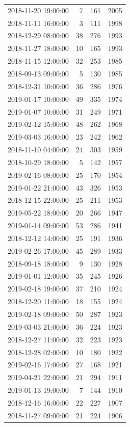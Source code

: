 \begin{tabular}{lrrr}
2018-11-20 19:00:00 & 7 & 161 & 2005 \\
2018-11-11 16:00:00 & 3 & 111 & 1998 \\
2018-12-29 08:00:00 & 38 & 276 & 1993 \\
2018-11-27 18:00:00 & 10 & 165 & 1993 \\
2018-11-15 12:00:00 & 32 & 253 & 1985 \\
2018-09-13 09:00:00 & 5 & 130 & 1985 \\
2018-12-31 10:00:00 & 36 & 286 & 1976 \\
2019-01-17 10:00:00 & 49 & 335 & 1974 \\
2019-01-07 10:00:00 & 31 & 249 & 1971 \\
2019-02-12 15:00:00 & 48 & 262 & 1968 \\
2019-03-03 16:00:00 & 23 & 242 & 1962 \\
2018-11-10 04:00:00 & 24 & 303 & 1959 \\
2018-10-29 18:00:00 & 5 & 142 & 1957 \\
2019-02-16 08:00:00 & 25 & 170 & 1954 \\
2019-01-22 21:00:00 & 43 & 326 & 1953 \\
2018-12-15 22:00:00 & 25 & 211 & 1953 \\
2019-05-22 18:00:00 & 20 & 266 & 1947 \\
2019-01-14 09:00:00 & 53 & 286 & 1941 \\
2018-12-12 14:00:00 & 25 & 191 & 1936 \\
2019-02-26 17:00:00 & 45 & 289 & 1933 \\
2018-09-18 18:00:00 & 9 & 130 & 1928 \\
2019-01-01 12:00:00 & 35 & 245 & 1926 \\
2019-02-18 19:00:00 & 37 & 210 & 1924 \\
2018-12-20 11:00:00 & 18 & 155 & 1924 \\
2019-02-18 09:00:00 & 50 & 287 & 1923 \\
2019-03-03 21:00:00 & 36 & 224 & 1923 \\
2018-12-27 11:00:00 & 32 & 223 & 1923 \\
2018-12-28 02:00:00 & 10 & 180 & 1922 \\
2019-02-16 17:00:00 & 27 & 168 & 1921 \\
2019-04-21 22:00:00 & 21 & 294 & 1911 \\
2019-01-13 19:00:00 & 7 & 144 & 1910 \\
2018-12-16 16:00:00 & 22 & 227 & 1907 \\
2018-11-27 09:00:00 & 21 & 224 & 1906 \\

\end{tabular}
